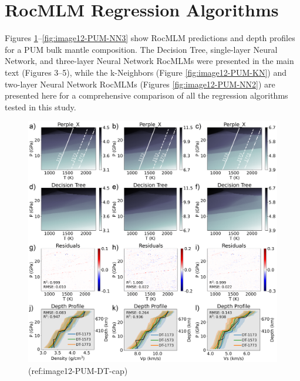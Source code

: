 \documentclass[draft]{agujournal2018}
\begin{document}
\clearpage

\section*{RocMLM Regression Algorithms}\label{rocmlm-regression-algorithms}

Figures \ref{fig:image12-PUM-DT}--\ref{fig:image12-PUM-NN3} show RocMLM predictions and depth profiles for a PUM bulk mantle composition. The Decision Tree, single-layer Neural Network, and three-layer Neural Network RocMLMs were presented in the main text (Figures 3--5), while the k-Neighbors (Figure \ref{fig:image12-PUM-KN}) and two-layer Neural Network RocMLMs (Figures \ref{fig:image12-PUM-NN2}) are presented here for a comprehensive comparison of all the regression algorithms tested in this study.



\begin{figure}[htbp]

{\centering \includegraphics[width=1\linewidth,]{image12-PUM-DT} 

}

\caption{(ref:image12-PUM-DT-cap)}\label{fig:image12-PUM-DT}
\end{figure}
\end{document}
